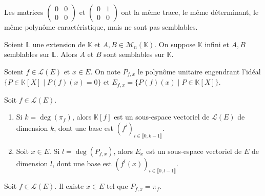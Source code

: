 
  \begin{cexample}
    Les matrices $\begin{pmatrix} 0 & 0 \\ 0 & 0\end{pmatrix}$ et $\begin{pmatrix} 0 & 1 \\ 0 & 0\end{pmatrix}$ ont la même trace, le même déterminant, le même polynôme caractéristique, mais ne sont pas semblables.
  \end{cexample}


  \begin{theorem}
    Soient $\mathbb{L}$ une extension de $\mathbb{K}$ et $A, B \in \mathcal{M}_n(\mathbb{K})$. On suppose $\mathbb{K}$ infini et $A, B$  semblables sur $\mathbb{L}$. Alors $A$ et $B$ sont semblables sur $\mathbb{K}$.
  \end{theorem}


  \begin{notation}
    Soient $f \in \mathcal{L}(E)$ et $x \in E$. On note $P_{f,x}$ le polynôme unitaire engendrant l'idéal $\{ P \in \mathbb{K}[X] \mid P(f)(x) = 0 \}$ et $E_{f,x} = \{ P(f)(x) \mid P \in \mathbb{K}[X] \}$.
  \end{notation}

  \begin{lemma}
    Soit $f \in \mathcal{L}(E)$.
    \begin{enumerate}[label=(\roman*)]
      \item Si $k = \deg(\pi_f)$, alors $\mathbb{K}[f]$ est un sous-espace vectoriel de $\mathcal{L}(E)$ de dimension $k$, dont une base est $(f^i)_{i \in \llbracket 0, k-1 \rrbracket}$.
      \item Soit $x \in E$. Si $l = \deg(P_{f,x})$, alors $E_x$ est un sous-espace vectoriel de $E$ de dimension $l$, dont une base est $(f^i(x))_{i \in \llbracket 0, l-1 \rrbracket}$.
    \end{enumerate}
  \end{lemma}

  \begin{lemma}
    Soit $f \in \mathcal{L}(E)$. Il existe $x \in E$ tel que $P_{f,x} = \pi_f$.
  \end{lemma}

